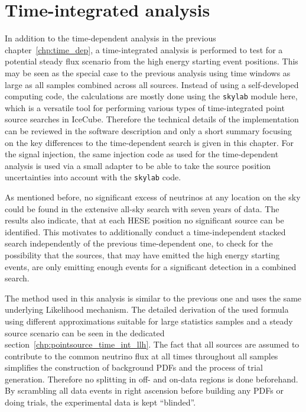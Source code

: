 \chapter{Time-integrated analysis}
  \label{chp:time_indep}
In addition to the time-dependent analysis in the previous chapter~\ref{chp:time_dep}, a time-integrated analysis is performed to test for a potential steady flux scenario from the high energy starting event positions.
This may be seen as the special case to the previous analysis using time windows as large as all samples combined across all sources.
Instead of using a self-developed computing code, the calculations are mostly done using the \lstinline!skylab! \cite{Aartsen:2016oji,skylabrepo} module here, which is a versatile tool for performing various types of time-integrated point source searches in IceCube.
Therefore the technical details of the implementation can be reviewed in the software description and only a short summary focusing on the key differences to the time-dependent search is given in this chapter.
For the signal injection, the same injection code as used for the time-dependent analysis is used via a small adapter to be able to take the source position uncertainties into account with the \lstinline!skylab! code.

As mentioned before, no significant excess of neutrinos at any location on the sky could be found in the extensive all-sky search with seven years of data.
The results also indicate, that at each HESE position no significant source can be identified.
This motivates to additionally conduct a time-independent stacked search independently of the previous time-dependent one, to check for the possibility that the sources, that may have emitted the high energy starting events, are only emitting enough events for a significant detection in a combined search.

The method used in this analysis is similar to the previous one and uses the same underlying Likelihood mechanism.
The detailed derivation of the used formula using different approximations suitable for large statistics samples and a steady source scenario can be seen in the dedicated section~\ref{chp:pointsource_time_int_llh}.
The fact that all sources are assumed to contribute to the common neutrino flux at all times throughout all samples simplifies the construction of background PDFs and the process of trial generation.
Therefore no splitting in off- and on-data regions is done beforehand.
By scrambling all data events in right ascension before building any PDFs or doing trials, the experimental data is kept \enquote{blinded}.

